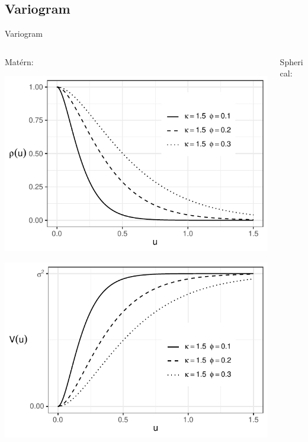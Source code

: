 \documentclass[
  ignorenonframetext,
]{beamer}
\begin{document}
\hypertarget{variogram-2}{%
\subsection{Variogram}\label{variogram-2}}

\begin{frame}{Variogram}
\small

\begin{columns}[T]
\begin{column}{0.48\textwidth}
Matérn:

\includegraphics{Lecture_1_files/figure-beamer/unnamed-chunk-47-1.pdf}

\includegraphics{Lecture_1_files/figure-beamer/unnamed-chunk-48-1.pdf}
\end{column}

\begin{column}{0.48\textwidth}
Spherical:


\end{column}
\end{columns}
\end{frame}
\end{document}
